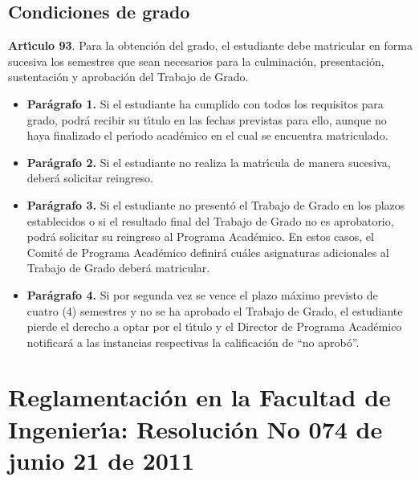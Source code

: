 \subsection{Condiciones de grado}
\textbf{Art\'{\i}culo 93}. Para la obtenci\'{o}n del grado, el estudiante debe
matricular en forma sucesiva los semestres que sean necesarios para
la culminaci\'{o}n, presentaci\'{o}n, sustentaci\'{o}n y aprobaci\'{o}n del Trabajo de
Grado.
\begin{itemize}

\item \textbf{Par\'{a}grafo 1.} Si el estudiante ha cumplido con todos los requisitos
para grado, podr\'{a} recibir su t\'{\i}tulo en las fechas previstas para
ello, aunque no haya finalizado el per\'{\i}odo acad\'{e}mico en el cual
se encuentra matriculado.

\item \textbf{Par\'{a}grafo 2.} Si el estudiante no realiza la matr\'{\i}cula de manera
sucesiva, deber\'{a} solicitar reingreso.

\item \textbf{Par\'{a}grafo 3.} Si el estudiante no present\'{o} el Trabajo de Grado en
los plazos establecidos o si el resultado final del Trabajo de Grado
no es aprobatorio, podr\'{a} solicitar su reingreso al Programa
Acad\'{e}mico. En estos casos, el Comit\'{e} de Programa Acad\'{e}mico
definir\'{a} cu\'{a}les asignaturas adicionales al Trabajo de Grado
deber\'{a} matricular.

\item \textbf{Par\'{a}grafo 4.} Si por segunda vez se vence el plazo m\'{a}ximo
previsto de cuatro (4) semestres y no se ha aprobado el Trabajo
de Grado, el estudiante pierde el derecho a optar por el t\'{\i}tulo y el
Director de Programa Acad\'{e}mico notificar\'{a} a las instancias
respectivas la calificaci\'{o}n de ``no aprob\'{o}''.
\end{itemize}


\section{Reglamentaci\'{o}n en la Facultad de Ingenier\'{\i}a: Resoluci\'{o}n No 074 de junio 21 de 2011}

